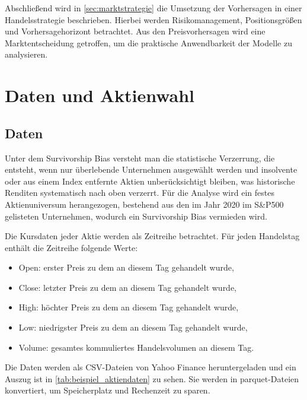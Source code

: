 Abschließend wird in \cref{sec:marktstrategie} die Umsetzung der Vorhersagen in einer Handelsstrategie beschrieben. Hierbei werden Risikomanagement, Positionsgrößen und Vorhersagehorizont betrachtet. Aus den Preisvorhersagen wird eine Marktentscheidung getroffen, um die praktische Anwendbarkeit der Modelle zu analysieren.






\section{Daten und Aktienwahl}\label{sec:daten_benchmarking}

\subsection{Daten}\label{subsec:daten}

Unter dem Survivorship Bias versteht man die statistische Verzerrung, die entsteht, wenn nur überlebende Unternehmen ausgewählt werden und insolvente oder aus einem Index entfernte Aktien unberücksichtigt bleiben, was historische Renditen systematisch nach oben verzerrt. Für die Analyse wird ein festes Aktienuniversum herangezogen, bestehend aus den im Jahr 2020 im S\&P500 gelisteten Unternehmen, wodurch ein Survivorship Bias vermieden wird.

Die Kursdaten jeder Aktie werden als Zeitreihe betrachtet. Für jeden Handelstag enthält die Zeitreihe folgende Werte:
\begin{itemize}
    \item Open: erster Preis zu dem an diesem Tag gehandelt wurde,
    \item Close: letzter Preis zu dem an diesem Tag gehandelt wurde,
    \item High: höchter Preis zu dem an diesem Tag gehandelt wurde,
    \item Low: niedrigster Preis zu dem an diesem Tag gehandelt wurde,
    \item Volume: gesamtes kommuliertes Handelsvolumen an diesem Tag.
\end{itemize}

Die Daten werden als CSV-Dateien von Yahoo Finance heruntergeladen und ein Auszug ist in \cref{tab:beispiel_aktiendaten} zu sehen. Sie werden in parquet-Dateien konvertiert, um Speicherplatz und Rechenzeit zu sparen.


